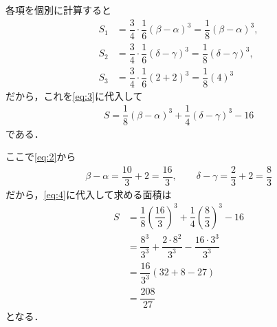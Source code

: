 \documentclass[../../main.tex]{subfiles}
\begin{document}
各項を個別に計算すると
\begin{align}
  S_1 &= \dfrac{3}{4}\cdot\dfrac{1}{6}(\beta-\alpha)^3=\dfrac{1}{8}(\beta-\alpha)^3,\\
  S_2 &= \dfrac{3}{4}\cdot\dfrac{1}{6}(\delta-\gamma)^3=\dfrac{1}{8}(\delta-\gamma)^3,\\
  S_3 &= \dfrac{3}{4}\cdot\dfrac{1}{6}(2+2)^3=\dfrac{1}{8}(4)^3
\end{align}
だから，これを\cref{eq:3}に代入して
\begin{align}
  S=\dfrac{1}{8}(\beta-\alpha)^3+\dfrac{1}{4}(\delta-\gamma)^3-16 \label{eq:4}
\end{align}
である．

ここで\cref{eq:2}から
\begin{align}
  \beta-\alpha=\dfrac{10}{3}+2=\dfrac{16}{3}, \qquad
  \delta-\gamma=\dfrac{2}{3}+2=\dfrac{8}{3}
\end{align}
だから，\cref{eq:4}に代入して求める面積は
\begin{align}
  S&=\dfrac{1}{8}\left(\dfrac{16}{3}\right)^3+\dfrac{1}{4}\left(\dfrac{8}{3}\right)^3-16\\
  &=\dfrac{8^3}{3^3}+\dfrac{2\cdot8^2}{3^3}-\dfrac{16\cdot3^3}{3^3}\\
  &=\dfrac{16}{3^3}(32+8-27)\\
  &=\dfrac{208}{27}
\end{align}
となる．

\newpage
\end{document}
